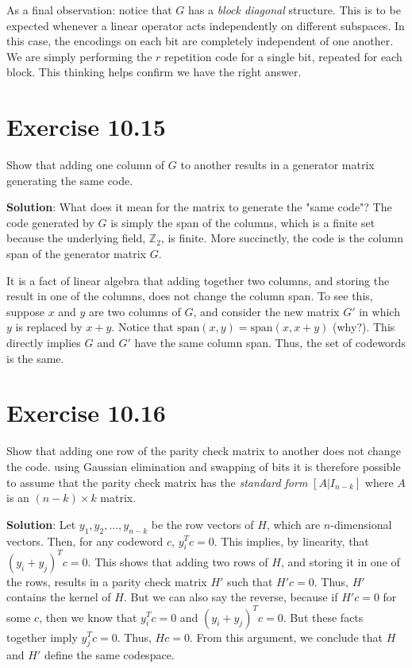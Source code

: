 \documentclass{book}
\begin{document}
    As a final observation: notice that $G$ has a \emph{block diagonal} structure. This is to be expected whenever a linear operator acts independently on different subspaces. In this case, the encodings on each bit are completely independent of one another. We are simply performing the $r$ repetition code for a single bit, repeated for each block. This thinking helps confirm we have the right answer.
    
\section*{Exercise 10.15}
    Show that adding one column of $G$ to another results in a generator matrix generating the same code.

    \textbf{Solution}: What does it mean for the matrix to generate the "same code"? The code generated by $G$ is simply the span of the columns, which is a finite set because the underlying field, $\mathbb{Z}_2$, is finite. More succinctly, the code is the column span of the generator matrix $G$.
    
    It is a fact of linear algebra that adding together two columns, and storing the result in one of the columns, does not change the column span. To see this, suppose $x$ and $y$ are two columns of $G$, and consider the new matrix $G'$ in which $y$ is replaced by $x + y$. Notice that $\mathrm{span}(x,y) = \mathrm{span}(x, x+y)$ (why?). This directly implies $G$ and $G'$ have the same column span. Thus, the set of codewords is the same.

\section*{Exercise 10.16}
    Show that adding one row of the parity check matrix to another does not change the code. using Gaussian elimination and swapping of bits it is therefore possible to assume that the parity check matrix has the \emph{standard form} $[A\vert I_{n-k}]$ where $A$ is an $(n-k)\times k$ matrix.

    \textbf{Solution}: Let $y_1, y_2, \dots, y_{n-k}$ be the row vectors of $H$, which are $n$-dimensional vectors. Then, for any codeword $c$, $y_i^T c = 0$. This implies, by linearity, that $(y_i + y_j)^T c = 0$. This shows that adding two rows of $H$, and storing it in one of the rows, results in a parity check matrix $H'$ such that $H' c = 0$. Thus, $H'$ contains the kernel of $H$. But we can also say the reverse, because if $H' c = 0$ for some $c$, then we know that $y_i^T c = 0$ and $(y_i + y_j)^T c = 0$. But these facts together imply $y_j^T c = 0$. Thus, $H c = 0$. From this argument, we conclude that $H$ and $H'$ define the same codespace.
\end{document}
